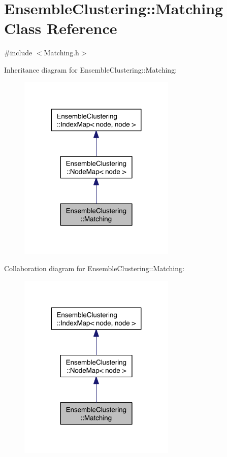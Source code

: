 \hypertarget{class_ensemble_clustering_1_1_matching}{\section{Ensemble\-Clustering\-:\-:Matching Class Reference}
\label{class_ensemble_clustering_1_1_matching}
}


{\ttfamily \#include $<$Matching.\-h$>$}



Inheritance diagram for Ensemble\-Clustering\-:\-:Matching\-:
\nopagebreak
\begin{figure}[H]
\begin{center}
\leavevmode
\includegraphics[width=212pt]{class_ensemble_clustering_1_1_matching__inherit__graph}
\end{center}
\end{figure}


Collaboration diagram for Ensemble\-Clustering\-:\-:Matching\-:
\nopagebreak
\begin{figure}[H]
\begin{center}
\leavevmode
\includegraphics[width=212pt]{class_ensemble_clustering_1_1_matching__coll__graph}
\end{center}
\end{figure}
